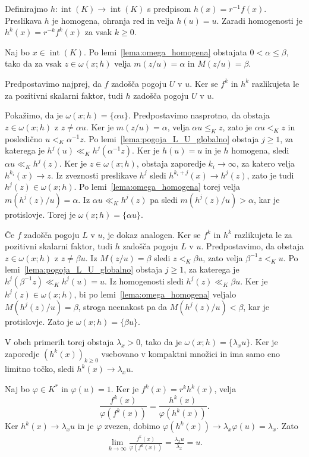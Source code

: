 \documentclass[mat2, tisk]{fmfdelo}
\begin{document}
\begin{dokaz}
  Definirajmo
  $h:\operatorname{int}(K)\longrightarrow\operatorname{int}(K)$ s
  predpisom $h(x)=r^{-1}f(x)$. Preslikava $h$ je homogena, ohranja red
  in velja $h(u)=u$. Zaradi homogenosti je
  $h^k(x)=r^{-k}f^k(x)$ za vsak $k\geq0$.

  Naj bo $x\in\operatorname{int}(K)$. Po
  lemi~\ref{lema:omega_homogena} obstajata
  $0<\alpha\leq\beta$, tako da za vsak
  $z\in\omega(x;h)$ velja
  $m(z/u)=\alpha$ in $M(z/u)=\beta$.

  Predpostavimo najprej, da $f$ zadošča pogoju $U$ v $u$. Ker se
  $f^k$ in $h^k$ razlikujeta le za pozitivni skalarni faktor, tudi
  $h$ zadošča pogoju $U$ v $u$.

  Pokažimo, da je $\omega(x;h)=\{\alpha u\}$. Predpostavimo nasprotno,
  da obstaja $z\in\omega(x;h)$ z $z\neq\alpha u$. Ker je
  $m(z/u)=\alpha$, velja $\alpha u\leq_Kz$, zato je
  $\alpha u<_K z$ in posledično $u<_K\alpha^{-1}z$.
  Po lemi~\ref{lema:pogoja_L_U_globalno} obstaja $j\geq1$, za katerega
  je $h^j(u)\ll_K h^j(\alpha^{-1}z)$. Ker je $h(u)=u$ in je $h$
  homogena, sledi
  $\alpha u\ll_K h^j(z)$.
  Ker je $z\in\omega(x;h)$, obstaja zaporedje
  $k_i\longrightarrow\infty$, za katero velja
  $h^{k_i}(x)\longrightarrow z$. Iz zveznosti preslikave
  $h^j$ sledi $h^{k_i+j}(x)\longrightarrow h^j(z)$,
  zato je tudi $h^j(z)\in\omega(x;h)$.
  Po lemi~\ref{lema:omega_homogena} torej velja
  $m(h^j(z)/u)=\alpha$.
  Iz
  $\alpha u\ll_K h^j(z)$ pa sledi
  $m(h^j(z)/u)>\alpha$, kar je protislovje. Torej je
  $\omega(x;h)=\{\alpha u\}$.

  Če $f$ zadošča pogoju $L$ v $u$, je dokaz analogen.
  Ker se $f^k$ in $h^k$ razlikujeta le za pozitivni
  skalarni faktor, tudi $h$ zadošča pogoju $L$ v $u$.
  Predpostavimo, da obstaja $z\in\omega(x;h)$ z
  $z\neq\beta u$. Iz $M(z/u)=\beta$ sledi
  $z<_K\beta u$, zato velja $\beta^{-1}z<_Ku$.
  Po lemi~\ref{lema:pogoja_L_U_globalno} obstaja
  $j\geq1$, za katerega je
  $h^j(\beta^{-1}z)\ll_Kh^j(u)=u$.
  Iz homogenosti sledi $h^j(z)\ll_K\beta u$.
  Ker je $h^j(z)\in\omega(x;h)$, bi po
  lemi~\ref{lema:omega_homogena} veljalo
  $M(h^j(z)/u)=\beta$, stroga neenakost pa da
  $M(h^j(z)/u)<\beta$, kar je protislovje.
  Zato je $\omega(x;h)=\{\beta u\}$.

  V obeh primerih torej obstaja $\lambda_x>0$, tako da je
  $\omega(x;h)=\{\lambda_xu\}$. Ker je zaporedje $(h^k(x))_{k\geq0}$
  vsebovano v kompaktni množici in ima samo eno limitno točko, sledi
  $h^k(x)\longrightarrow\lambda_xu$.

  Naj bo $\varphi\in K^*$ in $\varphi(u)=1$. Ker je
  $f^k(x)=r^kh^k(x)$, velja
  \[
  \frac{f^k(x)}{\varphi(f^k(x))}
  =
  \frac{h^k(x)}{\varphi(h^k(x))}.
  \]
  Ker $h^k(x)\longrightarrow\lambda_xu$ in je $\varphi$ zvezen,
  dobimo
  $\varphi(h^k(x))\longrightarrow\lambda_x\varphi(u)=\lambda_x$.
  Zato
  \begin{align*}
  \lim_{k\to\infty}
  \frac{f^k(x)}{\varphi(f^k(x))}
  =
  \frac{\lambda_xu}{\lambda_x}
  =
  u.
  \end{align*}
\end{dokaz}
\end{document}
